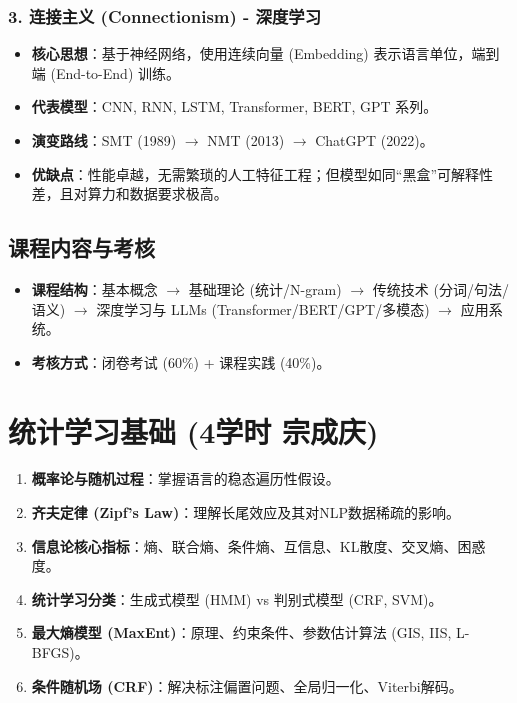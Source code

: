 \documentclass[a4paper, 11pt]{ctexart}
\begin{document}
\subsubsection{3. 连接主义 (Connectionism) - 深度学习}
\begin{itemize}
    \item \textbf{核心思想}：基于神经网络，使用连续向量 (Embedding) 表示语言单位，端到端 (End-to-End) 训练。
    \item \textbf{代表模型}：CNN, RNN, LSTM, Transformer, BERT, GPT 系列。
    \item \textbf{演变路线}：SMT (1989) $\to$ NMT (2013) $\to$ ChatGPT (2022)。
    \item \textbf{优缺点}：性能卓越，无需繁琐的人工特征工程；但模型如同“黑盒”可解释性差，且对算力和数据要求极高。
\end{itemize}

\subsection{课程内容与考核}
\begin{itemize}
    \item \textbf{课程结构}：基本概念 $\to$ 基础理论 (统计/N-gram) $\to$ 传统技术 (分词/句法/语义) $\to$ 深度学习与 LLMs (Transformer/BERT/GPT/多模态) $\to$ 应用系统。
    \item \textbf{考核方式}：闭卷考试 (60\%) + 课程实践 (40\%)。
\end{itemize}
\newpage


\section{统计学习基础 \small{(4学时 宗成庆)}}

\begin{note}[本章复习重点]
\begin{enumerate}
    \item \textbf{概率论与随机过程}：掌握语言的稳态遍历性假设。
    \item \textbf{齐夫定律 (Zipf's Law)}：理解长尾效应及其对NLP数据稀疏的影响。
    \item \textbf{信息论核心指标}：熵、联合熵、条件熵、互信息、KL散度、交叉熵、困惑度。
    \item \textbf{统计学习分类}：生成式模型 (HMM) vs 判别式模型 (CRF, SVM)。
    \item \textbf{最大熵模型 (MaxEnt)}：原理、约束条件、参数估计算法 (GIS, IIS, L-BFGS)。
    \item \textbf{条件随机场 (CRF)}：解决标注偏置问题、全局归一化、Viterbi解码。
\end{enumerate}
\end{note}
\end{document}
